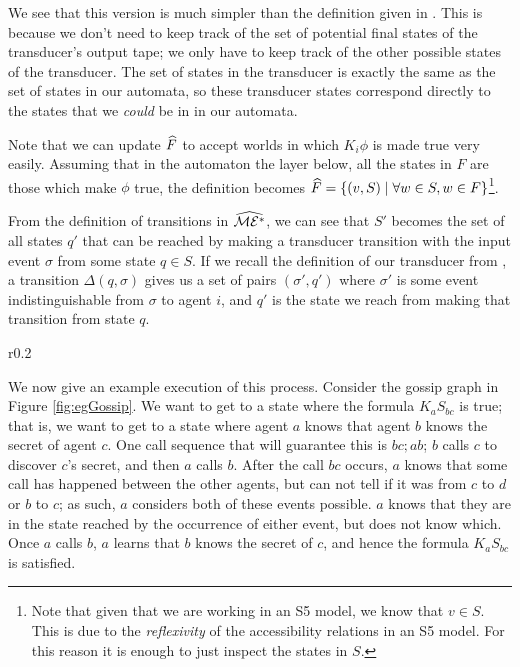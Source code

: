 \documentclass[10pt, a4paper]{report}
\begin{document}
We see that this version is much simpler than the definition given in
. This is because we don't need to keep track of the
set of potential final states of the transducer's output tape; we only have to
keep track of the other possible states of the transducer. The set of states in
the transducer is exactly the same as the set of states in our \mestar automata,
so these transducer states correspond directly to the states that we
\emph{could} be in in our \mestar automata.

Note that we can update $\widehat{F}$ to accept worlds in which $K_i \phi$ is made
true very easily. Assuming that in the automaton the layer below, all the states
in $F$ are those which make $\phi$ true, the definition becomes $\widehat{F} =
\left\{ (v, S) \mid \forall w \in S, w \in F \right\}$\footnote{Note that given
  that we are working in an \textsf{S5} model, we know that $v \in S$. This is
  due to the \emph{reflexivity} of the accessibility relations in an \textsf{S5}
model. For this reason it is enough to just inspect the states in $S$.}.

From the definition of transitions in $\widehat{\mathcal{ME^\ast}}$, we can see that $S'$
becomes the set of all states $q'$ that can be reached by making a transducer
transition with the input event $\sigma$ from some state $q \in S$. If we recall
the definition of our transducer from , a
transition $\Delta(q, \sigma)$ gives us a set of pairs $(\sigma', q')$ where
$\sigma'$ is some event indistinguishable from $\sigma$ to agent $i$, and $q'$
is the state we reach from making that transition from state $q$.

\begin{wrapfigure}{r}{0.2\textwidth}
  \centering
  \caption{}
  \label{fig:egGossip}
\end{wrapfigure}

We now give an example execution of this process. Consider the gossip graph in
Figure \ref{fig:egGossip}. We want to get to a state where the formula $K_a
S_{bc}$ is true; that is, we want to get to a state where agent $a$ knows that
agent $b$ knows the secret of agent $c$. One call sequence that will guarantee
this is $bc; ab$; $b$ calls $c$ to discover $c$'s secret, and then $a$ calls
$b$. After the call $bc$ occurs, $a$ knows that some call has happened between
the other agents, but can not tell if it was from $c$ to $d$ or $b$ to $c$; as
such, $a$ considers both of these events possible. $a$ knows that they are in
the state reached by the occurrence of either event, but does not know which.
Once $a$ calls $b$, $a$ learns that $b$ knows the secret of $c$, and hence the
formula $K_a S_{bc}$ is satisfied. 
\end{document}
